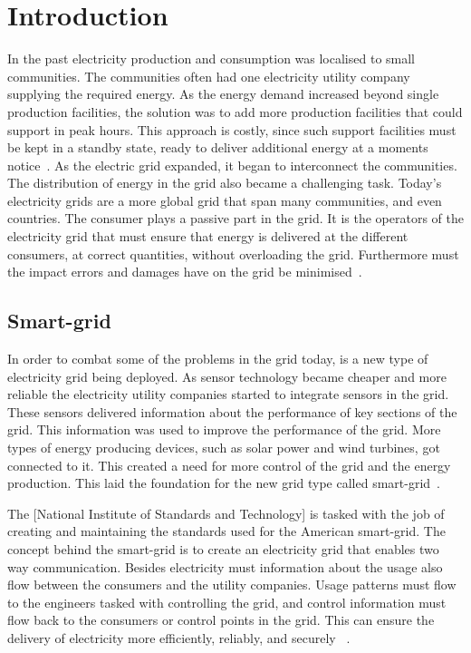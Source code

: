 \chapter{Introduction}
In the past electricity production and consumption was localised to small communities. The communities often had one electricity utility company supplying the required energy. As the energy demand increased beyond single production facilities, the solution was to add more production facilities that could support in peak hours. This approach is costly, since such support facilities must be kept in a standby state, ready to deliver additional energy at a moments notice~\citep{RefWorks:46}. As the electric grid expanded, it began to interconnect the communities. The distribution of energy in the grid also became a challenging task. Today's electricity grids are a more global grid that span many communities, and even countries. The consumer plays a passive part in the grid. It is the  operators of the electricity grid that must ensure that energy is delivered at the different consumers, at correct quantities, without overloading the grid. Furthermore must the impact errors and damages have on the grid be minimised~\citep{RefWorks:43}. 

\section{Smart-grid}
In order to combat some of the problems in the grid today, is a new type of electricity grid being deployed. As sensor technology became cheaper and more reliable the electricity utility companies started to integrate sensors in the grid. These sensors delivered information about the performance of key sections of the grid. This information was used to improve the performance of the grid. More types of energy producing devices, such as solar power and wind turbines, got connected to it. This created a need for more control of the grid and the energy production. This laid the foundation for the new grid type called smart-grid~\citep{RefWorks:43}.

The [National Institute of Standards and Technology] is tasked with the job of creating and maintaining the standards used for the American smart-grid. The concept behind the smart-grid is to create an electricity grid that enables two way communication. Besides electricity must information about the usage also flow between the consumers and the utility companies. Usage patterns must flow to the engineers tasked with controlling the grid, and control information must flow back to the consumers or control points in the grid. This can ensure the delivery of electricity more efficiently, reliably, and securely ~\citep{RefWorks:42}. 

